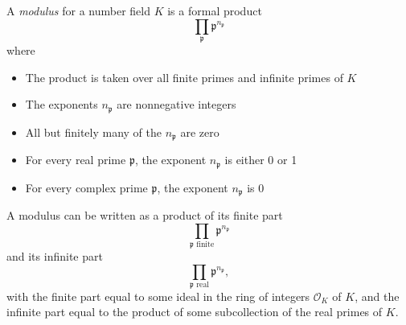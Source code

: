 \documentclass[12pt]{article}
\newcommand{\p}{\mathfrak{p}}
\begin{document}
A {\em modulus} for a number field $K$ is a formal product
$$
\prod_{\p} \p^{n_\p}
$$
where
\begin{itemize}
\item The product is taken over all finite primes and infinite primes of $K$
\item The exponents $n_\p$ are nonnegative integers
\item All but finitely many of the $n_\p$ are zero
\item For every real prime $\p$, the exponent $n_\p$ is either 0 or 1
\item For every complex prime $\p$, the exponent $n_\p$ is 0
\end{itemize}
A modulus can be written as a product of its finite part
$$
\prod_{\p \text{ finite}} \p^{n_\p}
$$
and its infinite part
$$
\prod_{\p \text{ real}} \p^{n_\p},
$$
with the finite part equal to some ideal in the ring of integers $\mathcal{O}_K$ of $K$, and the infinite part equal to the product of some subcollection of the real primes of $K$.
\end{document}
